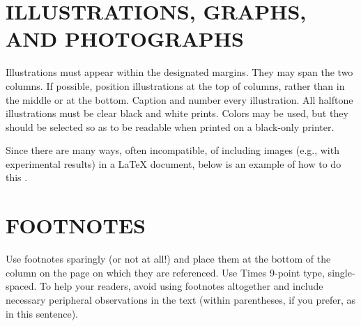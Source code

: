 \documentclass{article}
\begin{document}
\section{ILLUSTRATIONS, GRAPHS, AND PHOTOGRAPHS}
\label{sec:illust}

Illustrations must appear within the designated margins.  They may span the two
columns.  If possible, position illustrations at the top of columns, rather
than in the middle or at the bottom.  Caption and number every illustration.
All halftone illustrations must be clear black and white prints.  Colors may be
used, but they should be selected so as to be readable when printed on a
black-only printer.

Since there are many ways, often incompatible, of including images (e.g., with
experimental results) in a LaTeX document, below is an example of how to do
this \cite{Lamp86}.

\section{FOOTNOTES}
\label{sec:foot}

Use footnotes sparingly (or not at all!) and place them at the bottom of the
column on the page on which they are referenced. Use Times 9-point type,
single-spaced. To help your readers, avoid using footnotes altogether and
include necessary peripheral observations in the text (within parentheses, if
you prefer, as in this sentence).
\end{document}

